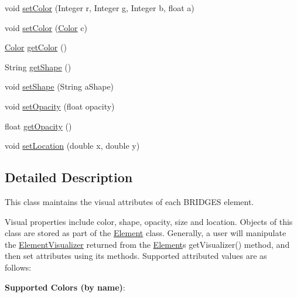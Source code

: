 \begin{DoxyCompactItemize}
\item 
void \mbox{\hyperlink{classbridges_1_1base_1_1_element_visualizer_a84fad1c8abe43b20c68c1800d7630918}{set\+Color}} (Integer r, Integer g, Integer b, float a)
\item 
void \mbox{\hyperlink{classbridges_1_1base_1_1_element_visualizer_a33172ab908f3b6f9740727b0bfe91565}{set\+Color}} (\mbox{\hyperlink{classbridges_1_1base_1_1_color}{Color}} c)
\item 
\mbox{\hyperlink{classbridges_1_1base_1_1_color}{Color}} \mbox{\hyperlink{classbridges_1_1base_1_1_element_visualizer_a3bf821b9bfa02746882bac934ce4fb8e}{get\+Color}} ()
\item 
String \mbox{\hyperlink{classbridges_1_1base_1_1_element_visualizer_a8ef0825745e49f32b57e4bf6c891b57e}{get\+Shape}} ()
\item 
void \mbox{\hyperlink{classbridges_1_1base_1_1_element_visualizer_ac3bad991904c8ad23e5233b341381d93}{set\+Shape}} (String a\+Shape)
\item 
void \mbox{\hyperlink{classbridges_1_1base_1_1_element_visualizer_a932f62eb1bd0c92da265a7f903dd0790}{set\+Opacity}} (float opacity)
\item 
float \mbox{\hyperlink{classbridges_1_1base_1_1_element_visualizer_ab86ff39f17f8d1766670b18be88b5492}{get\+Opacity}} ()
\item 
void \mbox{\hyperlink{classbridges_1_1base_1_1_element_visualizer_a04f3416447f2042de7cd21ce5b6a0598}{set\+Location}} (double x, double y)
\end{DoxyCompactItemize}


\subsection{Detailed Description}
This class maintains the visual attributes of each B\+R\+I\+D\+G\+ES element. 

Visual properties include color, shape, opacity, size and location. Objects of this class are stored as part of the \mbox{\hyperlink{classbridges_1_1base_1_1_element}{Element}} class. Generally, a user will manipulate the \mbox{\hyperlink{classbridges_1_1base_1_1_element_visualizer}{Element\+Visualizer}} returned from the \mbox{\hyperlink{classbridges_1_1base_1_1_element}{Element}}\textquotesingle{}s get\+Visualizer() method, and then set attributes using its methods. Supported attributed values are as follows\+:~\newline


{\bfseries Supported Colors (by name)}\+: 


